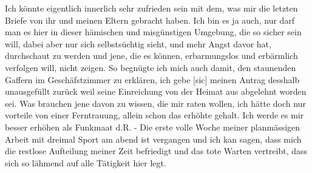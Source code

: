 \def\day{16. Januar 1943}
\mktitle

Ich k\"{o}nnte eigentlich innerlich sehr zufrieden sein mit dem, was mir die letzten Briefe von ihr und meinen Eltern gebracht haben.
Ich bin es ja auch, nur darf man es hier in dieser h\"{a}mischen und misg\"{u}nstigen Umgebung, die so sicher sein will, dabei aber nur sich selbsts\"{u}chtig sieht, und mehr Angst davor hat, durchschaut zu werden und jene, die es k\"{o}nnen, erbarmungslos und erb\"{a}rmlich verfolgen will, nicht zeigen.
So begn\"{u}gte ich mich auch damit, den staunenden Gaffern im Gesch\"{a}fstzimmer zu erkl\"{a}ren, ich gebe{\color{red} [sic] } meinen Antrag desshalb unausgef\"{u}llt zur\"{u}ck weil seine Einreichung von der Heimat aus abgelehnt worden sei.
Was brauchen jene davon zu wissen, die mir raten wollen, ich h\"{a}tte doch nur vorteile von einer Ferntrauung, allein schon das erh\"{o}hte gehalt.
Ich werde es mir besser erh\"{o}hen als Funkmaat d.R.
- Die erste volle Woche meiner planm\"{a}ssigen Arbeit mit dreimal Sport am abend ist vergangen und ich kan sagen, dass mich die restlose Aufteilung meiner Zeit befriedigt und das tote Warten vertreibt, dass sich so l\"{a}hmend auf alle T\"{a}tigkeit hier legt.

\clearpage
